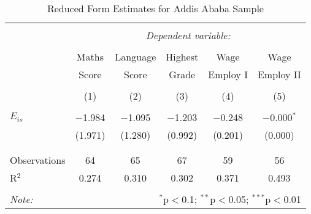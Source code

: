 

\begin{table}[!htbp] \centering 
  \caption{Reduced Form Estimates for Addis Ababa Sample} 
  \label{} 
\begin{tabular}{@{\extracolsep{5pt}}lccccc} 
\\[-1.8ex]\hline 
\hline \\[-1.8ex] 
 & \multicolumn{5}{c}{\textit{Dependent variable:}} \\ 
\cline{2-6} 
\\[-1.8ex] & Maths & Language & Highest & Wage & Wage \\ 
 & Score & Score & Grade & Employ I & Employ II \\
\\[-1.8ex] & (1) & (2) & (3) & (4) & (5)\\ 
\hline \\[-1.8ex] 
 $E_{is}$ & $-$1.984 & $-$1.095 & $-$1.203 & $-$0.248 & $-$0.000$^{*}$ \\ 
  & (1.971) & (1.280) & (0.992) & (0.201) & (0.000) \\ 
  & & & & & \\ 
\hline \\[-1.8ex] 
Observations & 64 & 65 & 67 & 59 & 56 \\ 
R$^{2}$ & 0.274 & 0.310 & 0.302 & 0.371 & 0.493 \\ 
\hline 
\hline \\[-1.8ex] 
\textit{Note:}  & \multicolumn{5}{r}{$^{*}$p$<$0.1; $^{**}$p$<$0.05; $^{***}$p$<$0.01} \\ 
\end{tabular} 
\end{table} 



